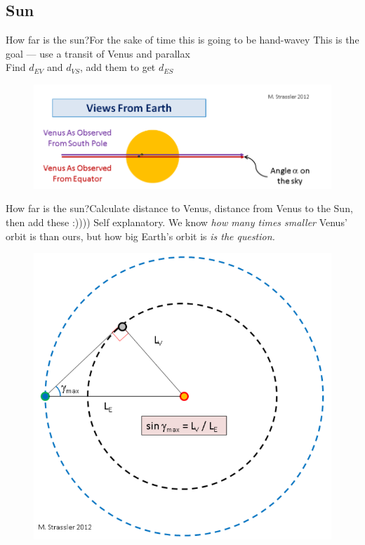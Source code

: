 \documentclass[12pt]{beamer}
\begin{document}
    \subsection{Sun}
        \begin{frame}{How far is the sun?}{For the sake of time this is going to be hand-wavey} \centering
            This is the goal --- use a transit of Venus and parallax\\
            Find $d_{EV}$ and $d_{VS}$, add them to get $d_{ES}$
            \begin{figure}
                \includegraphics[scale=0.5, frame]{venustransit.png}
            \end{figure}
        \end{frame}
        \begin{frame}{How far is the sun?}{Calculate distance to Venus, distance from Venus to the Sun, then add these :))))}
            Self explanatory. We know \textit{how many times smaller} Venus' orbit is than ours, but how big Earth's orbit is \textit{is the question.}
            \begin{figure}
                \includegraphics[scale=0.3]{venusorbit.png}
            \end{figure}
        \end{frame}
\end{document}
